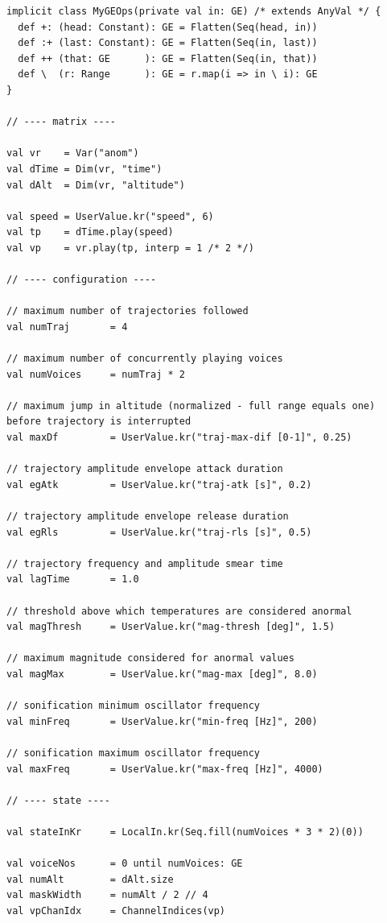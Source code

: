 \documentclass[11pt,a4paper]{article}
\begin{document}
\begin{lstlisting}[style=scala-small]
implicit class MyGEOps(private val in: GE) /* extends AnyVal */ {
  def +: (head: Constant): GE = Flatten(Seq(head, in))
  def :+ (last: Constant): GE = Flatten(Seq(in, last))
  def ++ (that: GE      ): GE = Flatten(Seq(in, that))
  def \  (r: Range      ): GE = r.map(i => in \ i): GE
}

// ---- matrix ----

val vr    = Var("anom")
val dTime = Dim(vr, "time")
val dAlt  = Dim(vr, "altitude")

val speed = UserValue.kr("speed", 6)
val tp    = dTime.play(speed)
val vp    = vr.play(tp, interp = 1 /* 2 */)

// ---- configuration ----

// maximum number of trajectories followed
val numTraj       = 4

// maximum number of concurrently playing voices
val numVoices     = numTraj * 2

// maximum jump in altitude (normalized - full range equals one) before trajectory is interrupted
val maxDf         = UserValue.kr("traj-max-dif [0-1]", 0.25)

// trajectory amplitude envelope attack duration
val egAtk         = UserValue.kr("traj-atk [s]", 0.2)

// trajectory amplitude envelope release duration
val egRls         = UserValue.kr("traj-rls [s]", 0.5)

// trajectory frequency and amplitude smear time
val lagTime       = 1.0

// threshold above which temperatures are considered anormal
val magThresh     = UserValue.kr("mag-thresh [deg]", 1.5)

// maximum magnitude considered for anormal values
val magMax        = UserValue.kr("mag-max [deg]", 8.0)

// sonification minimum oscillator frequency
val minFreq       = UserValue.kr("min-freq [Hz]", 200)

// sonification maximum oscillator frequency
val maxFreq       = UserValue.kr("max-freq [Hz]", 4000)

// ---- state ----

val stateInKr     = LocalIn.kr(Seq.fill(numVoices * 3 * 2)(0))

val voiceNos      = 0 until numVoices: GE
val numAlt        = dAlt.size
val maskWidth     = numAlt / 2 // 4
val vpChanIdx     = ChannelIndices(vp)


\end{lstlisting}
\end{document}
